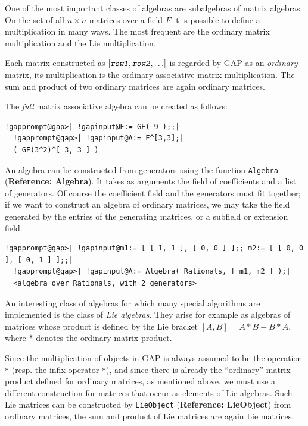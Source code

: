 \documentclass[a4paper,11pt]{report}
\begin{document}
{{ One of the most important classes of algebras are
sub\texttt{}algebras of matrix algebras. On the set of all $n \times n$ matrices over a field $F$ it is possible to define a multiplication in many ways. The most frequent are
the ordinary matrix multiplication and the Lie multiplication. 

 Each matrix constructed as $[ \mbox{\texttt{\mdseries\slshape row1}}, \mbox{\texttt{\mdseries\slshape row2}}, \ldots ]$ is regarded by \textsf{GAP} as an \emph{ordinary} matrix, its multiplication is the ordinary associative matrix multiplication.
The sum and product of two ordinary matrices are again ordinary matrices. 

 The \emph{full} matrix associative algebra can be created as follows: 

 
\begin{Verbatim}[commandchars=!@|,fontsize=\small,frame=single,label=Example]
  !gapprompt@gap>| !gapinput@F:= GF( 9 );;|
  !gapprompt@gap>| !gapinput@A:= F^[3,3];|
  ( GF(3^2)^[ 3, 3 ] )
\end{Verbatim}
 

 An algebra can be constructed from generators using the function \texttt{Algebra} (\textbf{Reference: Algebra}). It takes as arguments the field of coefficients and a list of generators. Of
course the coefficient field and the generators must fit together; if we want
to construct an algebra of ordinary matrices, we may take the field generated
by the entries of the generating matrices, or a subfield or extension field. 

 
\begin{Verbatim}[commandchars=!@|,fontsize=\small,frame=single,label=Example]
  !gapprompt@gap>| !gapinput@m1:= [ [ 1, 1 ], [ 0, 0 ] ];; m2:= [ [ 0, 0 ], [ 0, 1 ] ];;|
  !gapprompt@gap>| !gapinput@A:= Algebra( Rationals, [ m1, m2 ] );|
  <algebra over Rationals, with 2 generators>
\end{Verbatim}
 

 An interesting class of algebras for which many special algorithms are
implemented is the class of \emph{Lie algebras}. They arise for example as algebras of matrices whose product is defined by
the Lie bracket $[ A, B ] = A * B - B * A$, where $*$ denotes the ordinary matrix product. 

 Since the multiplication of objects in \textsf{GAP} is always assumed to be the operation \texttt{*} (resp. the infix operator \texttt{*}), and since there is already the ``ordinary'' matrix product defined for ordinary matrices, as mentioned above, we must use
a different construction for matrices that occur as elements of Lie algebras.
Such Lie matrices can be constructed by \texttt{LieObject} (\textbf{Reference: LieObject}) from ordinary matrices, the sum and product of Lie matrices are again Lie
matrices. 

}}
\end{document}
